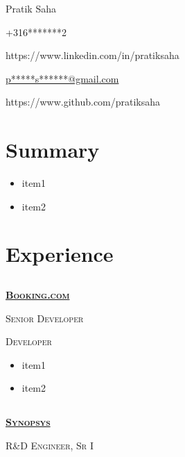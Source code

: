 \documentclass{article}
\begin{document}
\begin{center}\selectfont\Large Pratik Saha\end{center}

{\raggedright \Mobilefone +316*******2} \hfill { \raggedleft \faLinkedin   https://www.linkedin.com/in/pratiksaha }

{\raggedright {} \href{mailto:p*****s******@gmail.com}{p*****s******@gmail.com}} \hfill { \raggedleft \faGithub https://www.github.com/pratiksaha }

\section{Summary}
\begin{itemize}[noitemsep,nolistsep]
	\item item1
	\item item2
\end{itemize}

\section{Experience}
\subsection[Booking.com]{}
{\raggedright{\textsc{\textbf{\href{https://www.booking.com/}{Booking.com}}}}} \hfill {}

{\raggedright{\textsc{Senior Developer}}} \hfill {}

{\raggedright{\textsc{Developer}}} \hfill {}

\begin{itemize}[noitemsep,nolistsep]
\item item1
\item item2
\end{itemize}

\subsection[Synopsys]{}

{\raggedright{\textsc{\textbf{\href{https://www.synopsys.com/}{Synopsys}}}}} \hfill {}

{\raggedright{\textsc{R\&D Engineer, Sr I}}} \hfill {}
\end{document}
